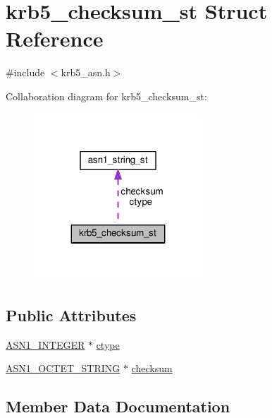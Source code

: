 \hypertarget{structkrb5__checksum__st}{}\section{krb5\+\_\+checksum\+\_\+st Struct Reference}
\label{structkrb5__checksum__st}


{\ttfamily \#include $<$krb5\+\_\+asn.\+h$>$}



Collaboration diagram for krb5\+\_\+checksum\+\_\+st\+:
\nopagebreak
\begin{figure}[H]
\begin{center}
\leavevmode
\includegraphics[width=179pt]{structkrb5__checksum__st__coll__graph}
\end{center}
\end{figure}
\subsection*{Public Attributes}
\begin{DoxyCompactItemize}
\item 
\hyperlink{ossl__typ_8h_af4335399bf9774cb410a5e93de65998b}{A\+S\+N1\+\_\+\+I\+N\+T\+E\+G\+ER} $\ast$ \hyperlink{structkrb5__checksum__st_ae066058605d0c59e10a98fbd71745705}{ctype}
\item 
\hyperlink{ossl__typ_8h_afbd05e94e0f0430a2b729473efec88c1}{A\+S\+N1\+\_\+\+O\+C\+T\+E\+T\+\_\+\+S\+T\+R\+I\+NG} $\ast$ \hyperlink{structkrb5__checksum__st_aaecf3ca4c97259edba8bc729103d81ba}{checksum}
\end{DoxyCompactItemize}


\subsection{Member Data Documentation}
